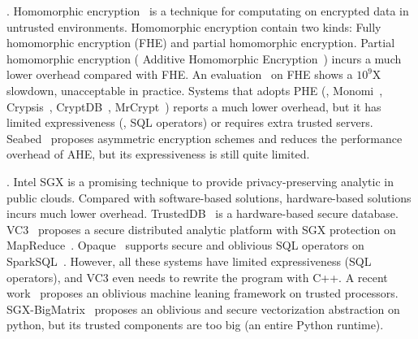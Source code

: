 . Homomorphic 
encryption~\cite{fullmomo:stoc09} is a
technique for computating on encrypted data in untrusted 
environments. Homomorphic encryption contain two kinds: Fully 
homomorphic encryption (FHE) and partial 
homomorphic encryption.
Partial homomorphic encryption (\eg{} Additive Homomorphic 
Encryption~\cite{paillier})
incurs a much lower overhead compared with FHE. An evaluation~\cite{homo:eval} 
on
FHE shows a $10^9$X slowdown, unacceptable in practice.
Systems that adopts PHE (\eg, Monomi~\cite{monomi:vldb13},
Crypsis~\cite{crypsis:hotcloud14}, CryptDB~\cite{cryptdb:sosp11},
MrCrypt~\cite{mrcrypt:oospsla14})
reports a much lower overhead, but it has limited expressiveness
(\eg, SQL operators) or requires extra trusted 
servers. Seabed~\cite{seabed:osdi16} proposes asymmetric encryption schemes and 
reduces the performance overhead of AHE, but its expressiveness is still quite
limited.

. Intel SGX is a promising technique 
to provide privacy-preserving analytic in public clouds. Compared with 
software-based solutions, hardware-based solutions incurs much lower overhead. 
TrustedDB~\cite{trusteddb:sigmod11} is a hardware-based secure database.
VC3~\cite{vc3:sp15} proposes a secure distributed analytic platform
with SGX protection on MapReduce~\cite{mapreduce}. 
Opaque~\cite{opaque:nsdi17} supports secure and oblivious SQL operators on 
SparkSQL~\cite{sparksql:sigmod15}. However, all these systems have limited 
expressiveness (\eg SQL operators), and VC3 even needs to rewrite the program 
with C++. A recent work~\cite{oblivious:security16} proposes an oblivious 
machine leaning framework on trusted processors. 
SGX-BigMatrix~\cite{bigmatrix:ccs17} proposes an oblivious and secure 
vectorization abstraction on python, but its trusted components are too big (an 
entire Python runtime).


